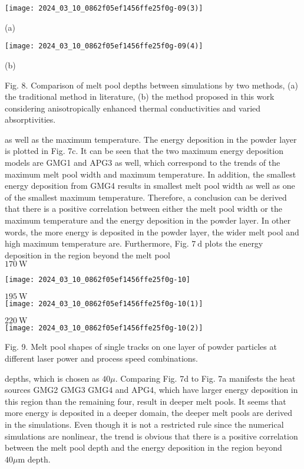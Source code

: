 \documentclass[10pt]{article}
\begin{document}
\begin{center}
\texttt{[image: 2024\_03\_10\_0862f05ef1456ffe25f0g-09(3)]}
\end{center}

(a)

\begin{center}
\texttt{[image: 2024\_03\_10\_0862f05ef1456ffe25f0g-09(4)]}
\end{center}

(b)

Fig. 8. Comparison of melt pool depths between simulations by two methods, (a) the traditional method in literature, (b) the method proposed in this work considering anisotropically enhanced thermal conductivities and varied absorptivities.

as well as the maximum temperature. The energy deposition in the powder layer is plotted in Fig. 7c. It can be seen that the two maximum energy deposition models are GMG1 and APG3 as well, which correspond to the trends of the maximum melt pool width and maximum temperature. In addition, the smallest energy deposition from GMG4 results in smallest melt pool width as well as one of the smallest maximum temperature. Therefore, a conclusion can be derived that there is a positive correlation between either the melt pool width or the maximum temperature and the energy deposition in the powder layer. In other words, the more energy is deposited in the powder layer, the wider melt pool and high maximum temperature are. Furthermore, Fig. $7 \mathrm{~d}$ plots the energy deposition in the region beyond the melt pool\\
$170 \mathrm{~W}$

\begin{center}
\texttt{[image: 2024\_03\_10\_0862f05ef1456ffe25f0g-10]}
\end{center}

$195 \mathrm{~W}$\\
\texttt{[image: 2024\_03\_10\_0862f05ef1456ffe25f0g-10(1)]}

$220 \mathrm{~W}$\\
\texttt{[image: 2024\_03\_10\_0862f05ef1456ffe25f0g-10(2)]}

Fig. 9. Melt pool shapes of single tracks on one layer of powder particles at different laser power and process speed combinations.

depths, which is chosen as $40 \mu$. Comparing Fig. 7d to Fig. 7a manifests the heat sources GMG2 GMG3 GMG4 and APG4, which have larger energy deposition in this region than the remaining four, result in deeper melt pools. It seems that more energy is deposited in a deeper domain, the deeper melt pools are derived in the simulations. Even though it is not a restricted rule since the numerical simulations are nonlinear, the trend is obvious that there is a positive correlation between the melt pool depth and the energy deposition in the region beyond $40 \mu \mathrm{m}$ depth.
\end{document}
